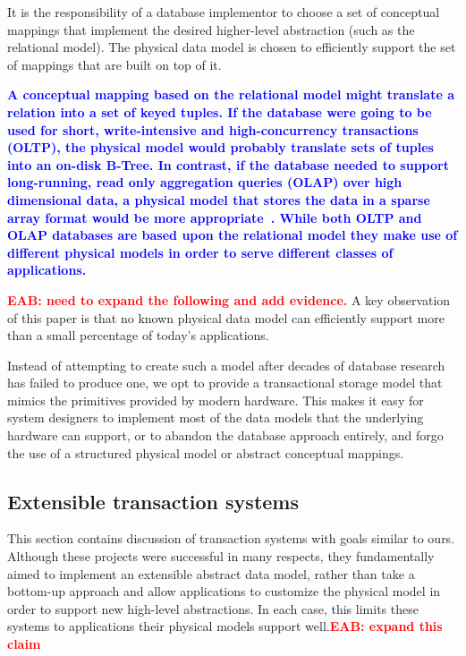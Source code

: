 \documentclass[letterpaper,twocolumn,10pt]{article}
\newcommand{\diff}[1]{\textcolor{blue}{\bf #1}}
\newcommand{\eab}[1]{\textcolor{red}{\bf EAB: #1}}
\begin{document}

It is the responsibility of a database implementor to choose a set of
conceptual mappings that implement the desired higher-level
abstraction (such as the relational model).  The physical data model
is chosen to efficiently support the set of mappings that are built on
top of it.

\diff{A conceptual mapping based on the relational model might
translate a relation into a set of keyed tuples.  If the database were
going to be used for short, write-intensive and high-concurrency
transactions (OLTP), the physical model would probably translate sets
of tuples into an on-disk B-Tree.  In contrast, if the database needed
to support long-running, read only aggregation queries (OLAP) over high 
dimensional data, a physical model that stores the data in a sparse array format would
be more appropriate~\cite{molap}.  While both OLTP and OLAP databases are based
upon the relational model they make use of different physical models
in order to serve different classes of applications.}

\eab{need to expand the following and add evidence.}
A key observation of this paper is that no known physical data model
can efficiently support more than a small percentage of today's applications.  

Instead of attempting to create such a model after decades of database
research has failed to produce one, we opt to provide a transactional
storage model that mimics the primitives provided by modern hardware.
This makes it easy for system designers to implement most of the data
models that the underlying hardware can support, or to
abandon the database approach entirely, and forgo the use of a
structured physical model or abstract conceptual mappings.

\subsection{Extensible transaction systems} 
\label{sec:otherDBs}
This section contains discussion of transaction systems with goals
similar to ours.  Although these projects were successful in many
respects, they fundamentally aimed to implement an extensible abstract
data model, rather than take a bottom-up approach and allow
applications to customize the physical model in order to support new
high-level abstractions.  In each case, this limits these systems to
applications their physical models support well.\eab{expand this claim}
\end{document}
